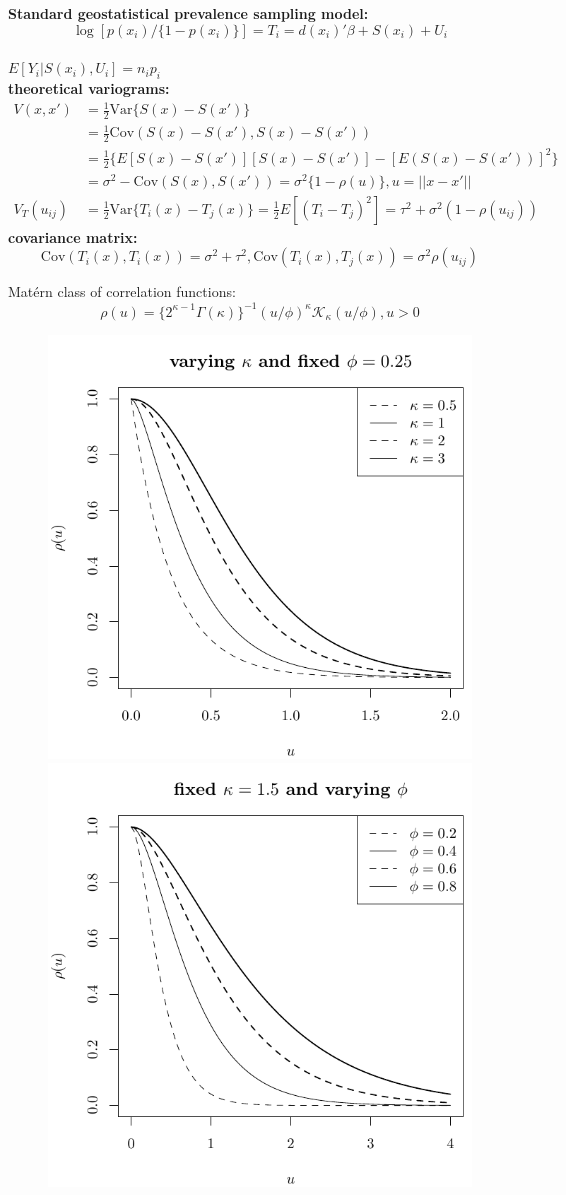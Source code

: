 \documentclass[11pt,compress,UTF8]{beamer}
\begin{document}
\begin{frame}  %
\textbf{Standard geostatistical prevalence sampling model:}\\
$$\log[p(x_i)/\{1-p(x_i)\}]=T_{i}=d(x_i)'\beta+S(x_i)+U_{i} $$ \\
$E[Y_{i}|S(x_i),U_{i}]=n_{i}p_{i}$\\
\textbf{theoretical variograms:}
\begin{equation*}
\begin{aligned}
V(x,x')&=\frac{1}{2}\mathrm{Var}\{S(x)-S(x')\}\\
&=\frac{1}{2}\mathrm{Cov}(S(x)-S(x'),S(x)-S(x'))\\
&=\frac{1}{2}\{E[S(x)-S(x')][S(x)-S(x')]-[E(S(x)-S(x'))]^2\}\\
&=\sigma^2-\mathrm{Cov}(S(x),S(x'))=\sigma^2\{1-\rho(u)\},u=||x-x'|| \\
V_{T}(u_{ij})&=\frac{1}{2}\mathrm{Var}\{T_{i}(x)-T_{j}(x)\}
=\frac{1}{2}E[(T_{i}-T_{j})^2]=\tau^2+\sigma^2(1-\rho(u_{ij}))
\end{aligned}
\end{equation*}
\textbf{covariance matrix:}
$$\mathrm{Cov}(T_{i}(x),T_{i}(x)) = \sigma^2+\tau^2, \mathrm{Cov}(T_{i}(x),T_{j}(x))=\sigma^2\rho(u_{ij})$$
\end{frame}

\begin{frame}
Mat\'ern class of correlation functions: $$\rho(u)=\{2^{\kappa -1}\Gamma(\kappa)\}^{-1}(u/\phi)^{\kappa}\mathcal{K}_{\kappa}(u/\phi),u > 0$$
\begin{figure}
\centering
\includegraphics[width=.5\textwidth]{matern1}
\includegraphics[width=.5\textwidth]{matern2}
\end{figure}
\end{frame}
\end{document}
